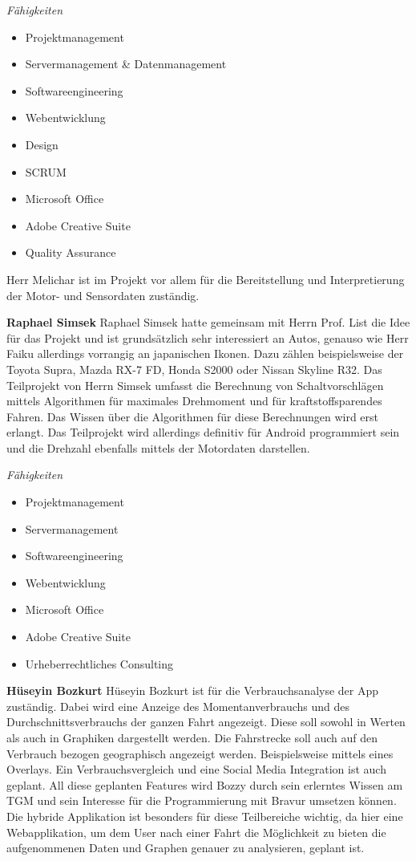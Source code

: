\textit{Fähigkeiten}
\begin{itemize}
	\item Projektmanagement
	\item Servermanagement & Datenmanagement				
	\item Softwareengineering
	\item Webentwicklung
	\item Design
	\item SCRUM
	\item Microsoft Office
	\item Adobe Creative Suite
	\item Quality Assurance
\end{itemize}
Herr Melichar ist im Projekt vor allem für die Bereitstellung und Interpretierung der Motor- und Sensordaten zuständig. 

\newpage

\textbf{Raphael Simsek}
Raphael Simsek hatte gemeinsam mit Herrn Prof. List die Idee für das Projekt und ist grundsätzlich sehr interessiert an Autos, genauso wie Herr Faiku allerdings vorrangig an japanischen Ikonen. Dazu zählen beispielsweise der Toyota Supra, Mazda RX-7 FD, Honda S2000 oder Nissan Skyline R32. Das Teilprojekt von Herrn Simsek umfasst die Berechnung von Schaltvorschlägen mittels Algorithmen für maximales Drehmoment und für kraftstoffsparendes Fahren. Das Wissen über die Algorithmen für diese Berechnungen wird erst erlangt. Das Teilprojekt wird allerdings definitiv für Android programmiert sein und die Drehzahl ebenfalls mittels der Motordaten darstellen.

\textit{Fähigkeiten}
\begin{itemize}
	\item Projektmanagement
	\item Servermanagement				
	\item Softwareengineering
	\item Webentwicklung
	\item Microsoft Office
	\item Adobe Creative Suite
	\item Urheberrechtliches Consulting
\end{itemize}

\textbf{Hüseyin Bozkurt}
Hüseyin Bozkurt ist für die Verbrauchsanalyse der App zuständig. Dabei wird eine Anzeige des Momentanverbrauchs und des Durchschnittsverbrauchs der ganzen Fahrt angezeigt. Diese soll sowohl in Werten als auch in Graphiken dargestellt werden. Die Fahrstrecke soll auch auf den Verbrauch bezogen geographisch angezeigt werden. Beispielsweise mittels eines Overlays. Ein Verbrauchsvergleich und eine Social Media Integration ist auch geplant.
All diese geplanten Features wird Bozzy durch sein erlerntes Wissen am TGM und sein Interesse für die Programmierung mit Bravur umsetzen können. Die hybride Applikation ist besonders für diese Teilbereiche wichtig, da hier eine Webapplikation, um dem User nach einer Fahrt die Möglichkeit zu bieten die aufgenommenen Daten und Graphen genauer zu analysieren, geplant ist.

